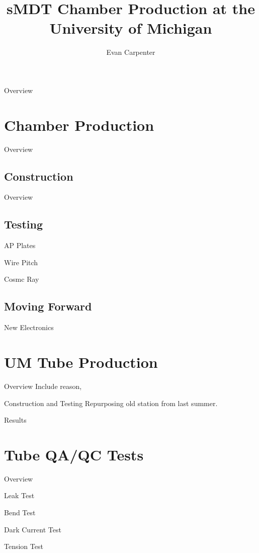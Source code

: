\documentclass{beamer}
\title{sMDT Chamber Production at the University of Michigan}
\author{Evan Carpenter}
\begin{document}
\titlepage
\begin{frame}{Overview}
	
\end{frame}
\section{Chamber Production}

	\begin{frame}{Overview}
	\end{frame}

	\subsection{Construction}

		\begin{frame}{Overview}
		\end{frame}

	\subsection{Testing}

		\begin{frame}{AP Plates}
		\end{frame}

		\begin{frame}{Wire Pitch}
		\end{frame}

		\begin{frame}{Cosmc Ray}
		\end{frame}
	
	\subsection{Moving Forward}

		\begin{frame}{New Electronics}
		\end{frame}
\section{UM Tube Production}
	\begin{frame}{Overview}
		Include reason, 
	\end{frame}
	\begin{frame}{Construction and Testing}
		Repurposing old station from last summer. 
	\end{frame}
	\begin{frame}{Results}
	\end{frame}
\section{Tube QA/QC Tests}
	\begin{frame}{Overview}
		
	\end{frame}

	\begin{frame}{Leak Test}
		
	\end{frame}
	\begin{frame}{Bend Test}
		
	\end{frame}
	\begin{frame}{Dark Current Test}
		
	\end{frame}
	\begin{frame}{Tension Test}
		
	\end{frame}
\end{document}
